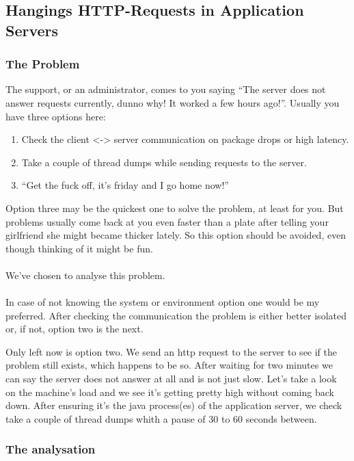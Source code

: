 \subsection{Hangings HTTP-Requests in Application Servers}

\subsubsection{The Problem}

The support, or an administrator, comes to you saying ``The server does not answer requests currently, dunno why! It worked a few hours ago!''.
Usually you have three options here:
\begin{enumerate}
\item Check the client <-> server communication on package drops or high latency.
\item Take a couple of thread dumps while sending requests to the server.
\item ``Get the fuck off, it's friday and I go home now!''
\end{enumerate}

Option three may be the quickest one to solve the problem, at least for you.
But problems usually come back at you even faster than a plate after telling your girlfriend she might became thicker lately.
So this option should be avoided, even though thinking of it might be fun.
\\\\
We've chosen to analyse this problem.
\\\\
In case of not knowing the system or environment option one would be my preferred.
After checking the communication the problem is either better isolated or, if not, option two is the next.

Only left now is option two. 
We send an http request to the server to see if the problem still exists, which happens to be so.
After waiting for two minutes we can say the server does not answer at all and is not just slow.
Let's take a look on the machine's load and we see it's getting pretty high without coming back down.
After ensuring it's the java process(es) of the application server, we check take a couple of thread dumps whith a pause of 30 to 60 seconds between.

\subsubsection{The analysation}

